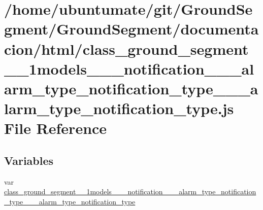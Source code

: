\hypertarget{class__ground__segment__1__1models__1__1__notification__1__1__alarm__type__notification__type__157c10bacd77890be29f8dabca044498a}{}\section{/home/ubuntumate/git/\+Ground\+Segment/\+Ground\+Segment/documentacion/html/class\+\_\+ground\+\_\+segment\+\_\+\_\+1models\+\_\+\_\+\_\+notification\+\_\+\_\+\_\+alarm\+\_\+type\+\_\+notification\+\_\+type\+\_\+\_\+\_\+alarm\+\_\+type\+\_\+notification\+\_\+type.js File Reference}
\label{class__ground__segment__1__1models__1__1__notification__1__1__alarm__type__notification__type__157c10bacd77890be29f8dabca044498a}
\subsection*{Variables}
\begin{DoxyCompactItemize}
\item 
var \hyperlink{class__ground__segment__1__1models__1__1__notification__1__1__alarm__type__notification__type__157c10bacd77890be29f8dabca044498a_afebe3404e63b580e227d2fb92ffb3d97}{class\+\_\+ground\+\_\+segment\+\_\+\_\+1models\+\_\+\_\+\_\+notification\+\_\+\_\+\_\+alarm\+\_\+type\+\_\+notification\+\_\+type\+\_\+\_\+\_\+alarm\+\_\+type\+\_\+notification\+\_\+type}
\end{DoxyCompactItemize}


